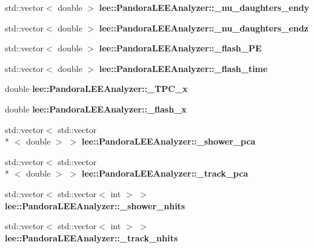 \begin{DoxyCompactItemize}
\item 
\hypertarget{group__lee_gafdefa43fde43f949f6b6af3e908cb1e2}{std\-::vector$<$ double $>$ {\bfseries lee\-::\-Pandora\-L\-E\-E\-Analyzer\-::\-\_\-nu\-\_\-daughters\-\_\-endy}}\label{group__lee_gafdefa43fde43f949f6b6af3e908cb1e2}

\item 
\hypertarget{group__lee_ga0c2eb616df5aa07c601d0bc72399c636}{std\-::vector$<$ double $>$ {\bfseries lee\-::\-Pandora\-L\-E\-E\-Analyzer\-::\-\_\-nu\-\_\-daughters\-\_\-endz}}\label{group__lee_ga0c2eb616df5aa07c601d0bc72399c636}

\item 
\hypertarget{group__lee_ga9320e2f0e9a7e201a978a21a2eb74a39}{std\-::vector$<$ double $>$ {\bfseries lee\-::\-Pandora\-L\-E\-E\-Analyzer\-::\-\_\-flash\-\_\-\-P\-E}}\label{group__lee_ga9320e2f0e9a7e201a978a21a2eb74a39}

\item 
\hypertarget{group__lee_gaecdf711df932ed4823d2c9b222a3e8f4}{std\-::vector$<$ double $>$ {\bfseries lee\-::\-Pandora\-L\-E\-E\-Analyzer\-::\-\_\-flash\-\_\-time}}\label{group__lee_gaecdf711df932ed4823d2c9b222a3e8f4}

\item 
\hypertarget{group__lee_ga8c55bb8de6e184c1adbc191f3d6f12d5}{double {\bfseries lee\-::\-Pandora\-L\-E\-E\-Analyzer\-::\-\_\-\-T\-P\-C\-\_\-x}}\label{group__lee_ga8c55bb8de6e184c1adbc191f3d6f12d5}

\item 
\hypertarget{group__lee_ga5d01876afb52464a4e5f508f58f1f2cc}{double {\bfseries lee\-::\-Pandora\-L\-E\-E\-Analyzer\-::\-\_\-flash\-\_\-x}}\label{group__lee_ga5d01876afb52464a4e5f508f58f1f2cc}

\item 
\hypertarget{group__lee_ga5ed991b6864eb5cfbfb10298ec9cfc64}{std\-::vector$<$ std\-::vector\\*
$<$ double $>$ $>$ {\bfseries lee\-::\-Pandora\-L\-E\-E\-Analyzer\-::\-\_\-shower\-\_\-pca}}\label{group__lee_ga5ed991b6864eb5cfbfb10298ec9cfc64}

\item 
\hypertarget{group__lee_ga9959360c0dd79addecff84a12dba3d49}{std\-::vector$<$ std\-::vector\\*
$<$ double $>$ $>$ {\bfseries lee\-::\-Pandora\-L\-E\-E\-Analyzer\-::\-\_\-track\-\_\-pca}}\label{group__lee_ga9959360c0dd79addecff84a12dba3d49}

\item 
\hypertarget{group__lee_gaabf1f57f8aef33cad913d8597e68ae52}{std\-::vector$<$ std\-::vector$<$ int $>$ $>$ {\bfseries lee\-::\-Pandora\-L\-E\-E\-Analyzer\-::\-\_\-shower\-\_\-nhits}}\label{group__lee_gaabf1f57f8aef33cad913d8597e68ae52}

\item 
\hypertarget{group__lee_ga4dc8bfc10c4854c7bb093bdee63291e9}{std\-::vector$<$ std\-::vector$<$ int $>$ $>$ {\bfseries lee\-::\-Pandora\-L\-E\-E\-Analyzer\-::\-\_\-track\-\_\-nhits}}\label{group__lee_ga4dc8bfc10c4854c7bb093bdee63291e9}

\end{DoxyCompactItemize}


